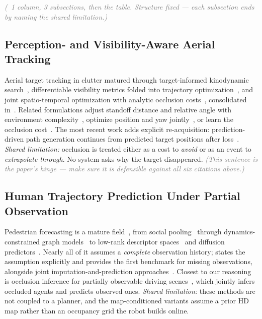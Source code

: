 \documentclass[conference]{IEEEtran}
\newcommand{\note}[1]{\textcolor{gray}{\textit{(#1)}}}
\begin{document}
\note{~1 column, 3 subsections, then the table. Structure fixed --- each
subsection ends by naming the shared limitation.}

\subsection{Perception- and Visibility-Aware Aerial Tracking}
Aerial target tracking in clutter matured through target-informed kinodynamic
search~\cite{han2021fasttracker}, differentiable visibility
metrics folded into trajectory
optimization~\cite{wang2021visibility,jeon2019online,bonatti2018cinematographer},
and joint spatio-temporal optimization with analytic occlusion
costs~\cite{ji2022elastic}, consolidated in~\cite{gao2024adaptive}. Related
formulations adjust standoff distance and relative angle with environment
complexity~\cite{svpto2023}, optimize position and yaw
jointly~\cite{tordesillas2022panther}, or learn the occlusion
cost~\cite{masnavi2022visibility}. The most recent work adds explicit
re-acquisition: prediction-driven path generation continues from predicted target
positions after loss~\cite{lin2026evatracker}.
\emph{Shared limitation:} occlusion is treated either as a cost to \emph{avoid}
or as an event to \emph{extrapolate through}. No system asks why the target
disappeared. \note{This sentence is the paper's hinge --- make sure it is
defensible against all six citations above.}

\subsection{Human Trajectory Prediction Under Partial Observation}
Pedestrian forecasting is a mature field~\cite{rudenko2020survey}, from social
pooling~\cite{alahi2016sociallstm,gupta2018socialgan} through dynamics-constrained
graph models~\cite{salzmann2020trajectron} to low-rank descriptor
spaces~\cite{bae2023eigentrajectory} and diffusion
predictors~\cite{bae2024singulartrajectory,mao2023led}. Nearly all of it assumes
a \emph{complete} observation history; \cite{chib2024trajimpute} states the
assumption explicitly and provides the first benchmark for missing observations,
alongside joint imputation-and-prediction
approaches~\cite{xu2023uncovering,becker2021missformer}. Closest to our reasoning
is occlusion inference for partially observable driving
scenes~\cite{shi2024sceneinformer}, which jointly infers occluded agents and
predicts observed ones.
\emph{Shared limitation:} these methods are not coupled to a planner, and the
map-conditioned variants assume a prior HD map rather than an occupancy grid the
robot builds online.
\end{document}
